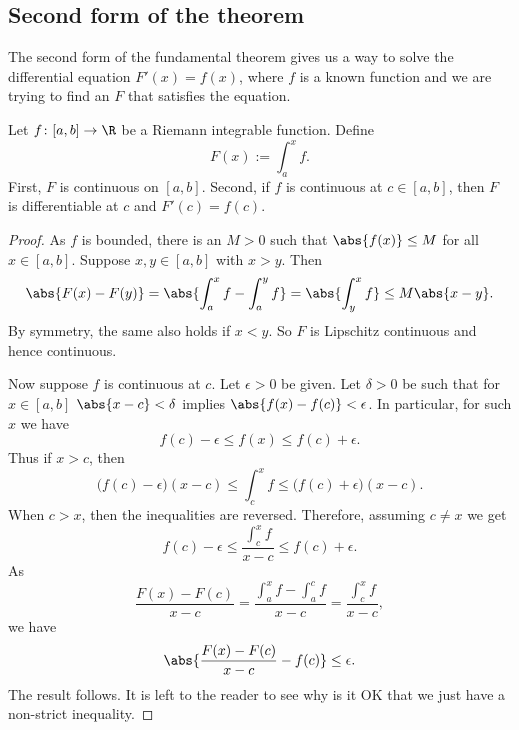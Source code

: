 \documentclass[12pt]{book}
\begin{document}
\subsection*{Second form of the theorem}

The second form of the fundamental theorem gives us a way to solve
the differential equation $F'(x) = f(x)$, where $f$ is a known
function and we are trying to find an $F$ that satisfies the equation.

\begin{thm}
Let $f \colon [a,b] \to \R$ be a Riemann integrable function.
Define
\begin{equation*}
F(x) := \int_a^x f .
\end{equation*}
First, $F$ is continuous on $[a,b]$.
Second,
if $f$ is continuous at $c \in [a,b]$, then $F$ is differentiable at $c$
and $F'(c) = f(c)$.
\end{thm}

\begin{proof}
As $f$ is bounded, there is an $M > 0$
such that $\abs{f(x)} \leq M$ for all $x \in [a,b]$.
Suppose $x,y \in [a,b]$
with $x > y$.
Then
\begin{equation*}
\abs{F(x)-F(y)} =
\abs{\int_a^x f - \int_a^y f}
=
\abs{\int_y^x f}
\leq
M\abs{x-y} .
\end{equation*}
By symmetry, the same also holds if $x < y$.
So $F$ is Lipschitz continuous and hence continuous.

Now suppose $f$ is continuous at $c$.
Let $\epsilon > 0$ be given.
Let $\delta > 0$ be such that
for $x \in [a,b]$
$\abs{x-c} < \delta$ implies $\abs{f(x)-f(c)} < \epsilon$.
In particular,
for such $x$ we have
\begin{equation*}
f(c)-\epsilon \leq f(x) \leq f(c) + \epsilon.
\end{equation*}
Thus if $x > c$, then
\begin{equation*}
\bigl(f(c)-\epsilon\bigr) (x-c) \leq \int_c^x f \leq
\bigl(f(c) + \epsilon\bigr)(x-c).
\end{equation*}
When $c > x$, then the inequalities are reversed.
Therefore,
assuming $c \not= x$ we get
\begin{equation*}
f(c)-\epsilon
\leq
\frac{\int_c^{x} f}{x-c}
\leq
f(c)+\epsilon .
\end{equation*}
As 
\begin{equation*}
\frac{F(x)-F(c)}{x-c}
=
\frac{\int_a^{x} f - \int_a^{c} f}{x-c}
=
\frac{\int_c^{x} f}{x-c} ,
\end{equation*}
we have 
\begin{equation*}
\abs{\frac{F(x)-F(c)}{x-c} - f(c)} \leq \epsilon .
\end{equation*}
The result follows.
It is left to the reader to see why is it OK that we
just have a non-strict inequality.
\end{proof}
\end{document}

